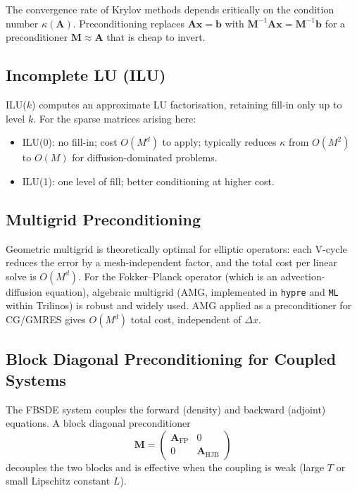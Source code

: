 The convergence rate of Krylov methods depends critically on the condition number
$\kappa(\mathbf{A})$. Preconditioning replaces $\mathbf{A}\mathbf{x}=\mathbf{b}$
with $\mathbf{M}^{-1}\mathbf{A}\mathbf{x} = \mathbf{M}^{-1}\mathbf{b}$ for a
preconditioner $\mathbf{M} \approx \mathbf{A}$ that is cheap to invert.

\subsection{Incomplete LU (ILU)}

ILU($k$) computes an approximate LU factorisation, retaining fill-in only up to
level $k$. For the sparse matrices arising here:
\begin{itemize}
    \item ILU(0): no fill-in; cost $O(M^d)$ to apply; typically reduces $\kappa$
    from $O(M^2)$ to $O(M)$ for diffusion-dominated problems.
    \item ILU(1): one level of fill; better conditioning at higher cost.
\end{itemize}

\subsection{Multigrid Preconditioning}

Geometric multigrid is theoretically optimal for elliptic operators: each
V-cycle reduces the error by a mesh-independent factor, and the total cost per
linear solve is $O(M^d)$. For the Fokker--Planck operator (which is an
advection-diffusion equation), algebraic multigrid (AMG, implemented in
\texttt{hypre} and \texttt{ML} within Trilinos) is robust and widely used.
AMG applied as a preconditioner for CG/GMRES gives $O(M^d)$ total cost,
independent of $\Delta x$.

\subsection{Block Diagonal Preconditioning for Coupled Systems}

The FBSDE system couples the forward (density) and backward (adjoint) equations.
A block diagonal preconditioner
\[
    \mathbf{M} = \begin{pmatrix} \mathbf{A}_{\mathrm{FP}} & 0 \\ 0 &
    \mathbf{A}_{\mathrm{HJB}} \end{pmatrix}
\]
decouples the two blocks and is effective when the coupling is weak (large $T$
or small Lipschitz constant $L$).

